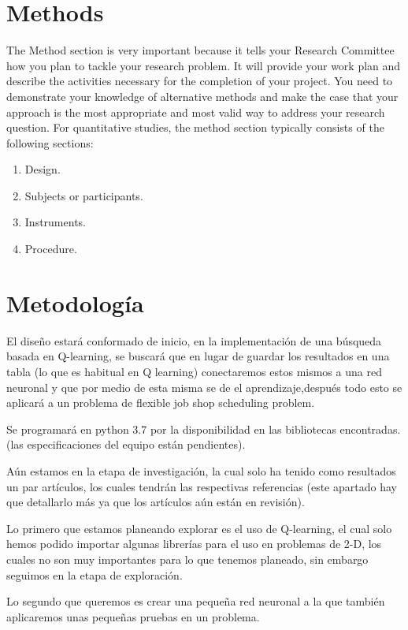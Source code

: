 \documentclass[letterpaper, 10 pt]{article}
\begin{document}
\section{Methods}
The Method section is very important because it tells your Research Committee how
you plan to tackle your research problem. It will provide your work plan and describe
the activities necessary for the completion of your project.
You need to demonstrate your knowledge of alternative methods and make the case
that your approach is the most appropriate and most valid way to address your
research question. \newline
For quantitative studies, the method section typically consists of the following
sections:
\begin{enumerate}
	\item Design.
	\item Subjects or participants.
	\item Instruments.
	\item Procedure.
\end{enumerate}

\section{Metodología}
El diseño estará conformado de inicio, en la implementación de una búsqueda basada en Q-learning, se buscará que en lugar de guardar los resultados en una tabla (lo que es habitual en Q learning) conectaremos estos mismos a  una red neuronal y que por medio de esta misma se de el aprendizaje,después todo esto se aplicará a un problema de flexible job shop scheduling problem.

Se programará en python 3.7 por la disponibilidad en las bibliotecas encontradas. (las especificaciones del equipo están pendientes).

Aún estamos en la etapa de investigación, la cual solo ha tenido como resultados un par artículos, los cuales tendrán las respectivas referencias (este apartado hay que detallarlo más ya que los artículos aún están en revisión).

Lo primero que estamos planeando explorar es el uso de Q-learning, el cual solo hemos podido importar algunas librerías para el uso en problemas de 2-D, los cuales no son muy importantes para lo que tenemos planeado, sin embargo seguimos en la etapa de exploración.

Lo segundo que queremos es crear una pequeña red neuronal a la que también aplicaremos unas pequeñas pruebas en un problema.
\end{document}
